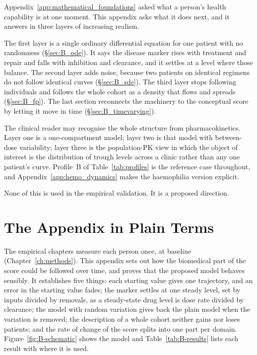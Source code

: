 
\label{app:dynamical}

\begin{ataglance}
Appendix~\ref{app:mathematical_foundations} asked what a person's health
capability is at one moment. This appendix asks what it does next, and it
answers in three layers of increasing realism.

The first layer is a single ordinary differential equation for one patient with
no randomness (\S\ref{sec:B_ode}). It says the disease marker rises with
treatment and repair and falls with inhibition and clearance, and it settles at
a level where those balance. The second layer adds noise, because two patients
on identical regimens do not follow identical curves (\S\ref{sec:B_sde}). The
third layer stops following individuals and follows the whole cohort as a
density that flows and spreads (\S\ref{sec:B_fp}). The last section reconnects
the machinery to the conceptual score by letting it move in time
(\S\ref{sec:B_timevarying}).

The clinical reader may recognise the whole structure from pharmacokinetics.
Layer one is a one-compartment model; layer two is that model with
between-dose variability; layer three is the population-PK view in which the
object of interest is the distribution of trough levels across a clinic rather
than any one patient's curve. Profile~B of Table~\ref{tab:profiles} is the
reference case throughout, and Appendix~\ref{app:hemo_dynamics} makes the haemophilia version explicit.

None of this is used in the empirical validation. It is a proposed direction.
\end{ataglance}

\section*{The Appendix in Plain Terms}

The empirical chapters measure each person once, at baseline
(Chapter~\ref{ch:methods}). This appendix sets out how the biomedical part of
the score could be followed over time, and proves that the proposed model
behaves sensibly. It establishes five things: each starting value gives one
trajectory, and an error in the starting value fades; the marker settles at one
steady level, set by inputs divided by removals, as a steady-state drug level is
dose rate divided by clearance; the model with random variation gives back the
plain model when the variation is removed; the description of a whole cohort
neither gains nor loses patients; and the rate of change of the score splits
into one part per domain. Figure~\ref{fig:B-schematic} shows the model and
Table~\ref{tab:B-results} lists each result with where it is used.

